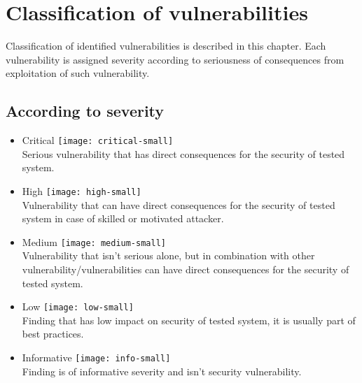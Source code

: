 \section{Classification of vulnerabilities}
Classification of identified vulnerabilities is described in this chapter. Each vulnerability is assigned severity according to seriousness of consequences from exploitation of such vulnerability.

\subsection{According to severity}

\begin{itemize}
\item Critical \nobreak\smallskip\protect\texttt{[image: critical-small]} \\
Serious vulnerability that has direct consequences for the security of tested system.

\item High \nobreak\smallskip\protect\texttt{[image: high-small]} \\
Vulnerability that can have direct consequences for the security of tested system in case of skilled or motivated attacker.

\item Medium \nobreak\smallskip\protect\texttt{[image: medium-small]} \\
Vulnerability that isn't serious alone, but in combination with other vulnerability/vulnerabilities can have direct consequences for the security of tested system.

\item Low \nobreak\smallskip\protect\texttt{[image: low-small]} \\
Finding that has low impact on security of tested system, it is usually part of best practices.

\item Informative \nobreak\smallskip\protect\texttt{[image: info-small]} \\
Finding is of informative severity and isn't security vulnerability.

\end{itemize}

